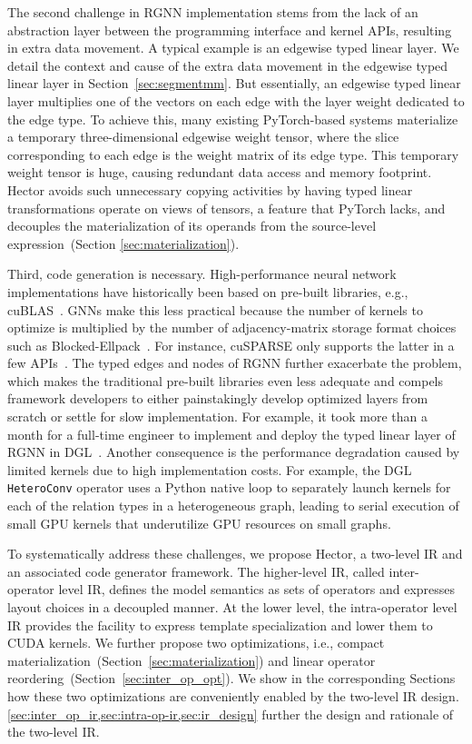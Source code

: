 The second challenge in RGNN implementation stems from the lack of an abstraction layer between the programming interface and kernel APIs, resulting in extra data movement.  A typical example is an edgewise typed linear layer.
We detail the context and cause of the extra data movement in the edgewise typed linear layer in Section~\ref{sec:segmentmm}. 
But essentially, an edgewise typed linear layer multiplies one of the vectors on each edge with the layer weight dedicated to the edge type.
To achieve this, many existing PyTorch-based systems materialize a temporary three-dimensional edgewise weight tensor, where the slice corresponding to each edge is the weight matrix of its edge type.
This temporary weight tensor is huge, causing redundant data access and memory footprint.
Hector avoids such unnecessary copying activities by having typed linear transformations operate on views of tensors, a feature that PyTorch lacks, and decouples the materialization of its operands 
from the source-level expression~(Section \ref{sec:materialization}).




Third, code generation is necessary. 
High-performance neural network implementations have historically been based on pre-built libraries, e.g.,  cuBLAS~\cite{nvidiaCublasgemmBatchedCuBLASDocuemntation}. 
GNNs make this less practical because the number of kernels to optimize is multiplied by the number of adjacency-matrix storage format choices such as Blocked-Ellpack~\cite{PMPP4}.
For instance, cuSPARSE only supports the latter in a few APIs~\cite{AcceleratingMatrixMultiplication}.
The typed edges and nodes of RGNN further exacerbate the problem, which makes the traditional pre-built libraries even less adequate and compels framework developers to either painstakingly develop optimized layers from scratch or settle for slow implementation.
For example, it took more than a month for a full-time engineer to implement and deploy the typed linear layer of RGNN in DGL~\cite{nisaFeatureGatherMm}.
Another consequence is the performance degradation caused by limited kernels due to high implementation costs. For example, the  DGL  \texttt{HeteroConv} operator uses a Python native loop to separately launch kernels for each of the relation types in a heterogeneous graph, leading to serial execution of small GPU kernels that underutilize GPU resources on small graphs. 



To systematically address these challenges, we propose Hector, a two-level IR and an associated code generator framework. 
The higher-level IR, called inter-operator level IR, defines the model semantics as sets of operators and expresses layout choices in a decoupled manner. At the lower level, the intra-operator level IR provides the facility to express template specialization and lower them to CUDA kernels. 
We further propose two optimizations, i.e., compact materialization~(Section~\ref{sec:materialization}) and linear operator reordering~(Section~\ref{sec:inter_op_opt}).
We show in the corresponding Sections how these two optimizations are conveniently enabled by the two-level IR design.
\cref{sec:inter_op_ir,sec:intra-op-ir,sec:ir_design} further the design and rationale of the two-level IR.



